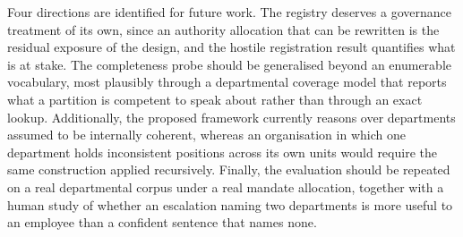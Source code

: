 \documentclass[journal]{IEEEtran}
\begin{document}
Four directions are identified for future work. The registry deserves a governance treatment of its own, since an authority allocation that can be rewritten is the residual exposure of the design, and the hostile registration result quantifies what is at stake. The completeness probe should be generalised beyond an enumerable vocabulary, most plausibly through a departmental coverage model that reports what a partition is competent to speak about rather than through an exact lookup. Additionally, the proposed framework currently reasons over departments assumed to be internally coherent, whereas an organisation in which one department holds inconsistent positions across its own units would require the same construction applied recursively. Finally, the evaluation should be repeated on a real departmental corpus under a real mandate allocation, together with a human study of whether an escalation naming two departments is more useful to an employee than a confident sentence that names none.



\end{document}

